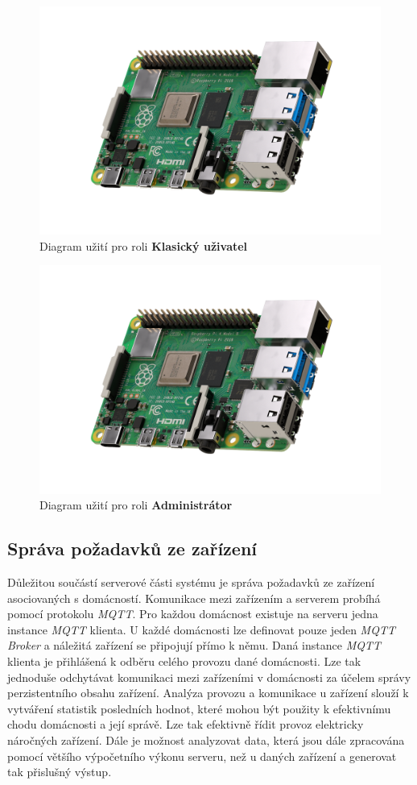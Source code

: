 \begin{figure}[hbt]
  \centering
  \includegraphics[width=0.4 \linewidth]{obrazky-figures/raspberry.png}
  \caption{Diagram užití pro roli \textbf{Klasický uživatel}}
  \label{figure:use_case_uzivatel}
\end{figure}

\begin{figure}[hbt]
  \centering
  \includegraphics[width=0.4 \linewidth]{obrazky-figures/raspberry.png}
  \caption{Diagram užití pro roli \textbf{Administrátor}}
  \label{figure:use_case_admin}
\end{figure}

\newpage
\subsection*{Správa požadavků ze zařízení}
\label{backend:mqtt}

Důležitou součástí serverové části systému je správa požadavků ze zařízení asociovaných s domácností. Komunikace mezi zařízením a serverem probíhá pomocí protokolu \emph{MQTT}.
Pro každou domácnost existuje na serveru jedna instance \emph{MQTT} klienta. U každé domácnosti lze definovat pouze jeden \emph{MQTT Broker} a náležitá zařízení se připojují přímo k němu.
Daná instance \emph{MQTT} klienta je přihlášená k odběru celého provozu dané domácnosti. Lze tak jednoduše odchytávat komunikaci mezi zařízeními v domácnosti za účelem správy perzistentního obsahu zařízení.
Analýza provozu a komunikace u zařízení slouží k vytváření statistik posledních hodnot, které mohou být použity k efektivnímu chodu domácnosti a její správě.
Lze tak efektivně řídit provoz elektricky náročných zařízení. Dále je možnost analyzovat data, která jsou dále zpracována pomocí většího výpočetního výkonu serveru, než u daných zařízení a generovat tak přislušný výstup.

